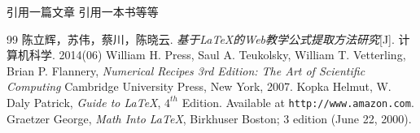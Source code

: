 \documentclass{ctexart}
\begin{document}
    引用一篇文章\cite{article1} 引用一本书\cite{book1}等等

    \begin{thebibliography}{99}
        陈立辉，苏伟，蔡川，陈晓云. \emph{基于LaTeX的Web教学公式提取方法研究}[J]. 计算机科学. 2014(06)
        William H. Press, Saul A. Teukolsky,
        William T. Vetterling, Brian P. Flannery,
        \emph{Numerical Recipes 3rd Edition:
            The Art of Scientific Computing}
        Cambridge University Press, New York, 2007.
         Kopka Helmut, W. Daly Patrick,
        \emph{Guide to \LaTeX}, $4^{th}$ Edition.
        Available at \texttt{http://www.amazon.com}.
         Graetzer George, \emph{Math Into \LaTeX},
        Birkhuser Boston; 3 edition (June 22, 2000).
    \end{thebibliography}
\end{document}
